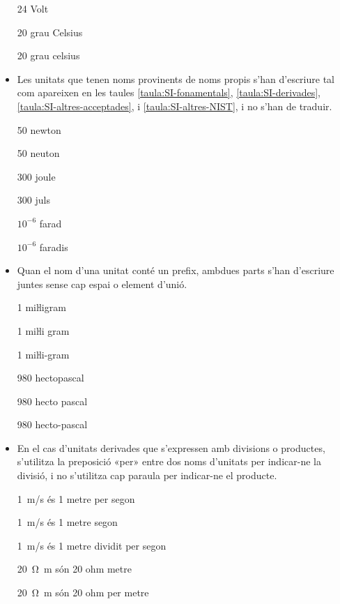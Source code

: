 \begin{itemize}
\textcolor{Red}\faTimesCircle{} 24 Volt

\textcolor{Green}\faCheckSquare{}  20 grau Celsius

\textcolor{Red}\faTimesCircle{} 20 grau celsius


\item Les unitats que tenen noms provinents de noms propis s'han
d'escriure tal com apareixen en les taules
\vref{taula:SI-fonamentals}, \vref{taula:SI-derivades}, \vref{taula:SI-altres-acceptades}, i \vref{taula:SI-altres-NIST}, i no s'han de traduir.

\textcolor{Green}\faCheckSquare{} 50 newton

\textcolor{Red}\faTimesCircle{}  50 neuton

\textcolor{Green}\faCheckSquare{} 300 joule

\textcolor{Red}\faTimesCircle{}  300 juls

\textcolor{Green}\faCheckSquare{} $10^{-6}$ farad

\textcolor{Red}\faTimesCircle{}  $10^{-6}$ faradis


 \item Quan el nom d'una unitat
conté un prefix, ambdues parts s'han d'escriure juntes sense cap espai o element d'unió.

\textcolor{Green}\faCheckSquare{} 1 miŀligram

\textcolor{Red}\faTimesCircle{} 1 miŀli gram

\textcolor{Red}\faTimesCircle{} 1 miŀli-gram

\textcolor{Green}\faCheckSquare{}  980 hectopascal

\textcolor{Red}\faTimesCircle{} 980 hecto pascal

\textcolor{Red}\faTimesCircle{} 980 hecto-pascal


\item En el cas  d'unitats derivades que s'expressen amb divisions o
productes, s'utilitza la preposició «per» entre dos noms d'unitats
per indicar-ne la divisió, i no s'utilitza cap paraula per indicar-ne el
producte.

\textcolor{Green}\faCheckSquare{} \SI{1}{m/s} és 1 metre per segon

\textcolor{Red}\faTimesCircle{}  \SI{1}{m/s} és 1 metre segon

\textcolor{Red}\faTimesCircle{}  \SI{1}{m/s} és 1 metre dividit per segon

 \textcolor{Green}\faCheckSquare{} \SI{20}{\ohm.m} són 20 ohm metre

\textcolor{Red}\faTimesCircle{}   \SI{20}{\ohm.m} són 20 ohm  per metre


\end{itemize}
